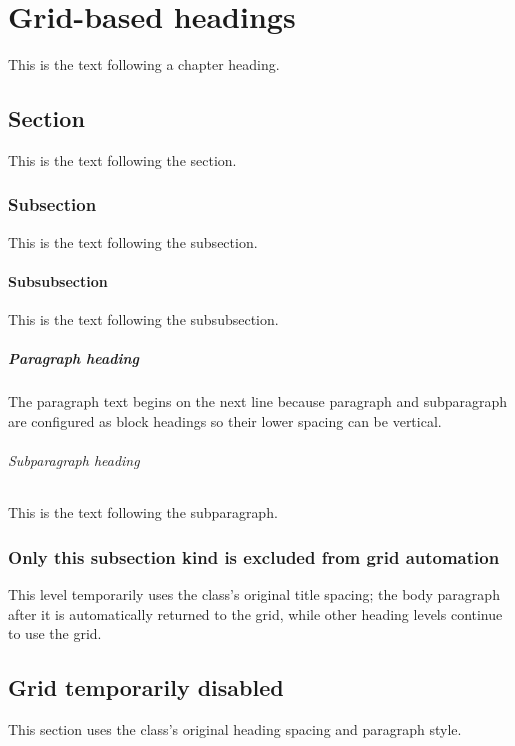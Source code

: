 \documentclass{report}
\begin{document}
\chapter{Grid-based headings}
This is the text following a chapter heading.

\section{Section}
This is the text following the section.

\subsection{Subsection}
This is the text following the subsection.

\subsubsection{Subsubsection}
This is the text following the subsubsection.

\paragraph{Paragraph heading}
The paragraph text begins on the next line because paragraph and subparagraph
are configured as block headings so their lower spacing can be vertical.

\subparagraph{Subparagraph heading}
This is the text following the subparagraph.

{\GridAutoOff[subsection]
\subsection{Only this subsection kind is excluded from grid automation}
This level temporarily uses the class's original title spacing; the body paragraph
after it is automatically returned to the grid, while other heading levels
continue to use the grid.
}

\begin{gridautoff}
\section{Grid temporarily disabled}
This section uses the class's original heading spacing and paragraph style.
\end{gridautoff}
\end{document}
